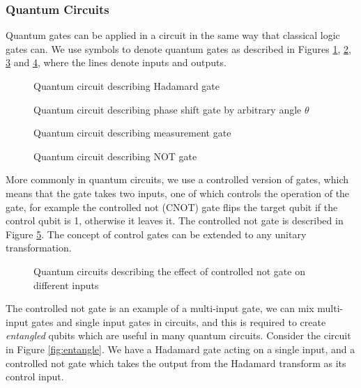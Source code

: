 \subsubsection{Quantum Circuits}
Quantum gates can be applied in a circuit in the same way that classical logic gates can. We use symbols to denote quantum gates as described in Figures \ref{fig:hadamardGate}, \ref{fig:phaseshiftGate}, \ref{fig:measurementGate} and \ref{fig:notGate}, where the lines denote inputs and outputs.
\begin{figure}[!htb]
\centering
\resizebox{2cm}{!}{}
\caption{Quantum circuit describing Hadamard gate}
\label{fig:hadamardGate}
\end{figure}\begin{figure}[!htb]
\centering
\resizebox{2cm}{!}{}
\caption{Quantum circuit describing phase shift gate by arbitrary angle $\theta$}
\label{fig:phaseshiftGate}
\end{figure}\begin{figure}[!htb]
\centering
\resizebox{2cm}{!}{}
\caption{Quantum circuit describing measurement gate}
\label{fig:measurementGate}
\end{figure}\begin{figure}[!htb]
\centering
\resizebox{2cm}{!}{}
\caption{Quantum circuit describing NOT gate}
\label{fig:notGate}
\end{figure}
More commonly in quantum circuits, we use a controlled version of gates, which means that the gate takes two inputs, one of which controls the operation of the gate, for example the controlled not (CNOT) gate flips the target qubit if the control qubit is 1, otherwise it leaves it. The controlled not gate is described in Figure \ref{fig:cnotGate}. The concept of control gates can be extended to any unitary transformation.
\begin{figure}[!htb]
\centering
\resizebox{5cm}{!}{}
\caption{Quantum circuits describing the effect of controlled not gate on different inputs}
\label{fig:cnotGate}
\end{figure}
The controlled not gate is an example of a multi-input gate, we can mix multi-input gates and single input gates in circuits, and this is required to create \emph{entangled} qubits which are useful in many quantum circuits. Consider the circuit in Figure \ref{fig:entangle}. We have a Hadamard gate acting on a single input, and a controlled not gate which takes the output from the Hadamard transform as its control input.
